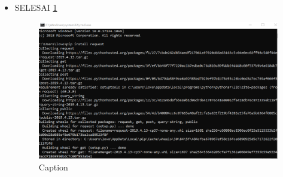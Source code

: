 \begin{enumerate}
\begin{itemize}
        \item SELESAI \ref{capture10}
        \begin{figure} [h]
            \centering
            \includegraphics[scale=0.3]{figures/Capture10.PNG}
            \caption{Caption}
            \label{capture10}
        \end{figure}
    \end{itemize}
    

\end{enumerate}
